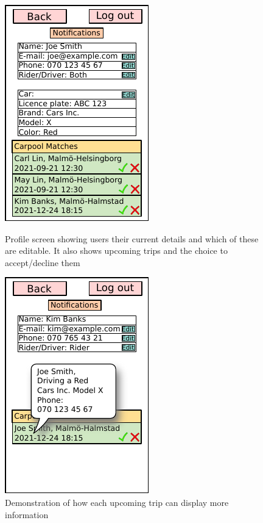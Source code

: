 \documentclass{article}
\begin{document}
\begin{figure}[!htpb]
    \centering
    \begin{minipage}{0.25\textwidth}
        \centering
        \includegraphics[scale=1]{prdFigures/profile.pdf}
        \caption{Profile screen showing users their current details and which of these are editable. It also shows upcoming trips and the choice to accept/decline them}
        \label{fig:profile}
    \end{minipage}\hfill
    \begin{minipage}{0.25\textwidth}
        \centering
        \includegraphics[scale=1]{prdFigures/profile2.pdf}
        \caption{Demonstration of how each upcoming trip can display more information}
        \label{fig:profile2}
    \end{minipage}\hfill
    \begin{minipage}{0.25\textwidth}

\end{minipage}
\end{figure}
\end{document}
